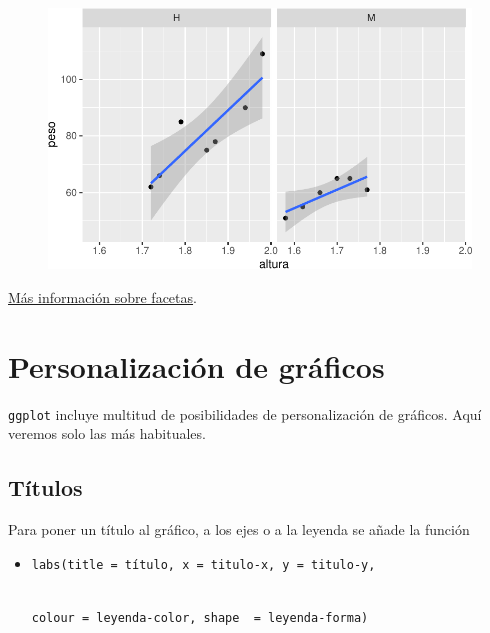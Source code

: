\documentclass[
  a4paper,
]{scrreport}
\providecommand{\tightlist}{%
  \setlength{\itemsep}{0pt}\setlength{\parskip}{0pt}}\usepackage{longtable,booktabs,array}
\theoremstyle{definition}
\theoremstyle{definition}
\theoremstyle{remark}
\begin{document}
\begin{figure}[H]

{\centering \includegraphics{./07-graficos_files/figure-pdf/unnamed-chunk-27-1.pdf}

}

\end{figure}

\href{https://ggplot2.tidyverse.org/reference/facet_wrap.html?q=facet_wrap}{Más
información sobre facetas}.

\hypertarget{personalizaciuxf3n-de-gruxe1ficos}{%
\section{Personalización de
gráficos}\label{personalizaciuxf3n-de-gruxe1ficos}}

\texttt{ggplot} incluye multitud de posibilidades de personalización de
gráficos. Aquí veremos solo las más habituales.

\hypertarget{tuxedtulos}{%
\subsection{Títulos}\label{tuxedtulos}}

Para poner un título al gráfico, a los ejes o a la leyenda se añade la
función

\begin{itemize}
\tightlist
\item
  \texttt{labs(title\ =\ título,\ x\ =\ titulo-x,\ y\ =\ titulo-y,}\strut \\
  \texttt{colour\ =\ leyenda-color,\ shape\ \ =\ leyenda-forma)}
\end{itemize}
\end{document}

